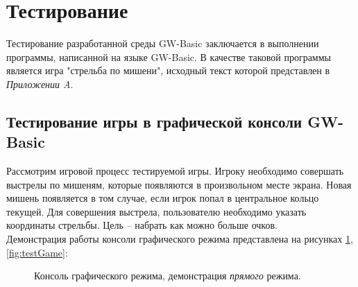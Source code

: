 \documentclass[12pt]{article}
\begin{document}
	\newpage
	\section{Тестирование}
		\hspace{\parindent} Тестирование разработанной среды GW-Basic заключается в выполнении программы, написанной на языке GW-Basic. В качестве таковой программы является игра "стрельба по мишени", исходный текст которой представлен в {\it Приложении A}.
		
		\subsection{Тестирование игры в графической консоли GW-Basic}
		\hspace{\parindent} Рассмотрим игровой процесс тестируемой игры. Игроку необходимо совершать выстрелы по мишеням, которые появляются в произвольном месте экрана. Новая мишень появляется в том случае, если игрок попал в центральное кольцо текущей. Для совершения выстрела, пользователю необходимо указать координаты стрельбы. Цель -- набрать как можно больше очков. \\ 
		\indent Демонстрация работы консоли графического режима представлена на рисунках \ref{fig:testDirect}, \ref{fig:testGame}:		
		\begin{figure}[h]
			\caption{Консоль графического режима, демонстрация {\it прямого} режима.}
			\label{fig:testDirect}
		\end{figure}
		
\end{document}
